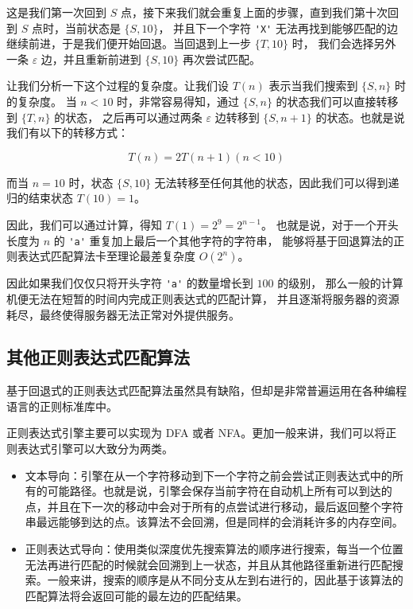 \documentclass[hyperref,UTF8,12pt,a4paper]{ctexart}
\begin{document}
这是我们第一次回到 $S$ 点，接下来我们就会重复上面的步骤，直到我们第十次回到 $S$ 点时，当前状态是 $\{S, 10\}$，
并且下一个字符 \verb|'X'| 无法再找到能够匹配的边继续前进，于是我们便开始回退。当回退到上一步 $\{T, 10\}$ 时，
我们会选择另外一条 $\varepsilon$ 边，并且重新前进到 $\{S, 10\}$ 再次尝试匹配。

让我们分析一下这个过程的复杂度。让我们设 $T(n)$ 表示当我们搜索到 $\{S, n\}$ 时的复杂度。
当 $n < 10$ 时，非常容易得知，通过 $\{S, n\}$ 的状态我们可以直接转移到 $\{T, n\}$ 的状态，
之后再可以通过两条 $\varepsilon$ 边转移到 $\{S, n+1\}$ 的状态。也就是说我们有以下的转移方式：

\[
	T(n) = 2 T(n+1) (n < 10)
\]

而当 $n = 10$ 时，状态 $\{S, 10\}$ 无法转移至任何其他的状态，因此我们可以得到递归的结束状态 $T(10) = 1$。

因此，我们可以通过计算，得知 $T(1) = 2^9 = 2^{n-1}$。
也就是说，对于一个开头长度为 $n$ 的 \verb|'a'| 重复加上最后一个其他字符的字符串，
能够将基于回退算法的正则表达式匹配算法卡至理论最差复杂度 $O(2^n)$。

因此如果我们仅仅只将开头字符 \verb|'a'| 的数量增长到 $100$ 的级别，
那么一般的计算机便无法在短暂的时间内完成正则表达式的匹配计算，
并且逐渐将服务器的资源耗尽，最终使得服务器无法正常对外提供服务。

\subsection{其他正则表达式匹配算法}

基于回退式的正则表达式匹配算法虽然具有缺陷，但却是非常普遍运用在各种编程语言的正则标准库中。

正则表达式引擎主要可以实现为 DFA 或者 NFA。更加一般来讲，我们可以将正则表达式引擎可以大致分为两类。

\begin{itemize}
	\item 文本导向：引擎在从一个字符移动到下一个字符之前会尝试正则表达式中的所有的可能路径。也就是说，引擎会保存当前字符在自动机上所有可以到达的点，并且在下一次的移动中会对于所有的点尝试进行移动，最后返回整个字符串最远能够到达的点。该算法不会回溯，但是同样的会消耗许多的内存空间。
	\item 正则表达式导向：使用类似深度优先搜索算法的顺序进行搜索，每当一个位置无法再进行匹配的时候就会回溯到上一状态，并且从其他路径重新进行匹配搜索。一般来讲，搜索的顺序是从不同分支从左到右进行的，因此基于该算法的匹配算法将会返回可能的最左边的匹配结果。
\end{itemize}
\end{document}

